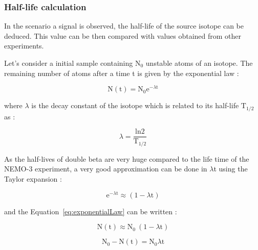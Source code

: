 \documentclass[main.tex]{subfiles}
\begin{document}
\FloatBarrier


\subsubsection{Half-life calculation}\label{sec:HalfLifeAnalysis}


\NI In the scenario a signal is observed, the half-life of the source isotope can be deduced. This value can be then compared with values obtained from other experiments.


\bigskip


\NI Let's consider a initial sample containing N$_\text{0}$ unstable atoms of an isotope. The remaining number of atoms after a time t is given by the exponential law :  


\begin{equation}\label{eq:exponentialLaw}
\text{N}(\text{t}) = \text{N}_\text{0} \text{e}^{-\lambda \text{t}}
\end{equation}


\bigskip


\NI where $\lambda$ is the decay constant of the isotope which is related to its half-life $\text{T}_{\text{1/2}}$ as : 


\begin{equation}\label{eq:lambda}
\lambda = \frac{\text{ln2}}{\text{T}_{\text{1/2}}}
\end{equation}


\bigskip


\NI As the half-lives of double beta are very huge compared to the life time of the NEMO-3 experiment, a very good approximation can be done in $\lambda$t using the Taylor expansion :  


\begin{equation}
\text{e}^{-\lambda \text{t}} \approx (\text{1}-\lambda \text{t})
\end{equation}


\bigskip


\NI and the Equation~\ref{eq:exponentialLaw} can be written :


\begin{equation}
\text{N}(\text{t}) \approx \text{N}_\text{0}~(\text{1} - \lambda \text{t})
\end{equation}

\begin{equation}\label{eq:N0}
\text{N}_\text{0} - \text{N} (\text{t}) = \text{N}_\text{0} \lambda \text{t}
\end{equation}
\end{document}
